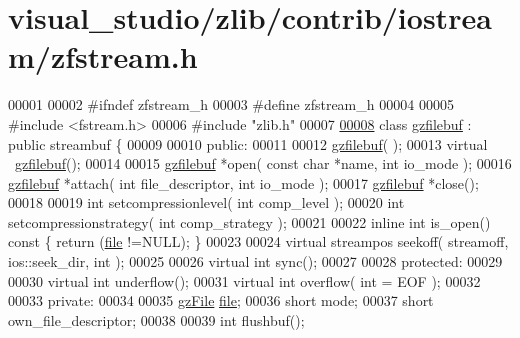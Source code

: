 \hypertarget{visual__studio_2zlib_2contrib_2iostream_2zfstream_8h_source}{}\section{visual\+\_\+studio/zlib/contrib/iostream/zfstream.h}
\label{visual__studio_2zlib_2contrib_2iostream_2zfstream_8h_source}

\begin{DoxyCode}
00001 
00002 \textcolor{preprocessor}{#ifndef zfstream\_h}
00003 \textcolor{preprocessor}{#define zfstream\_h}
00004 
00005 \textcolor{preprocessor}{#include <fstream.h>}
00006 \textcolor{preprocessor}{#include "zlib.h"}
00007 
\hyperlink{classgzfilebuf}{00008} \textcolor{keyword}{class }\hyperlink{classgzfilebuf}{gzfilebuf} : \textcolor{keyword}{public} streambuf \{
00009 
00010 \textcolor{keyword}{public}:
00011 
00012   \hyperlink{classgzfilebuf}{gzfilebuf}( );
00013   \textcolor{keyword}{virtual} ~\hyperlink{classgzfilebuf}{gzfilebuf}();
00014 
00015   \hyperlink{classgzfilebuf}{gzfilebuf} *open( \textcolor{keyword}{const} \textcolor{keywordtype}{char} *name, \textcolor{keywordtype}{int} io\_mode );
00016   \hyperlink{classgzfilebuf}{gzfilebuf} *attach( \textcolor{keywordtype}{int} file\_descriptor, \textcolor{keywordtype}{int} io\_mode );
00017   \hyperlink{classgzfilebuf}{gzfilebuf} *close();
00018 
00019   \textcolor{keywordtype}{int} setcompressionlevel( \textcolor{keywordtype}{int} comp\_level );
00020   \textcolor{keywordtype}{int} setcompressionstrategy( \textcolor{keywordtype}{int} comp\_strategy );
00021 
00022   \textcolor{keyword}{inline} \textcolor{keywordtype}{int} is\_open()\textcolor{keyword}{ const }\{ \textcolor{keywordflow}{return} (\hyperlink{structfile}{file} !=NULL); \}
00023 
00024   \textcolor{keyword}{virtual} streampos seekoff( streamoff, ios::seek\_dir, \textcolor{keywordtype}{int} );
00025 
00026   \textcolor{keyword}{virtual} \textcolor{keywordtype}{int} sync();
00027 
00028 \textcolor{keyword}{protected}:
00029 
00030   \textcolor{keyword}{virtual} \textcolor{keywordtype}{int} underflow();
00031   \textcolor{keyword}{virtual} \textcolor{keywordtype}{int} overflow( \textcolor{keywordtype}{int} = EOF );
00032 
00033 \textcolor{keyword}{private}:
00034 
00035   \hyperlink{structgz_file__s}{gzFile} \hyperlink{structfile}{file};
00036   \textcolor{keywordtype}{short} mode;
00037   \textcolor{keywordtype}{short} own\_file\_descriptor;
00038 
00039   \textcolor{keywordtype}{int} flushbuf();

\end{DoxyCode}
